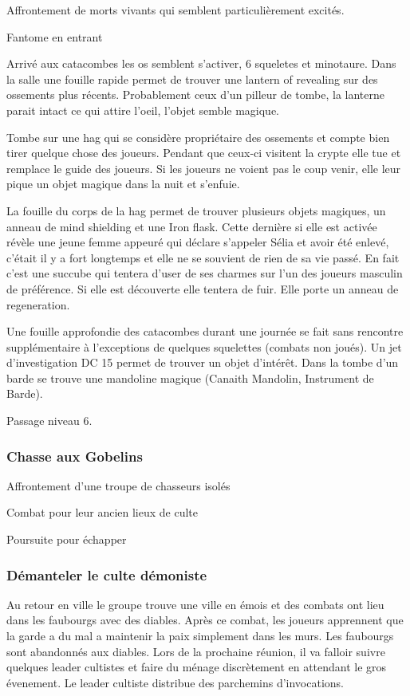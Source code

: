Affrontement de morts vivants qui semblent particulièrement excités.

Fantome en entrant

Arrivé aux catacombes les os semblent s'activer, 6 squeletes et minotaure.
Dans la salle une fouille rapide permet de trouver une lantern of revealing 
sur des ossements plus récents. Probablement ceux d'un pilleur de tombe, la 
lanterne parait intact ce qui attire l'oeil, l'objet semble magique.

Tombe sur une hag qui se considère propriétaire des ossements et compte bien tirer quelque chose des joueurs.
Pendant que ceux-ci visitent la crypte elle tue et remplace le guide des joueurs. Si les joueurs ne voient pas le coup
venir, elle leur pique un objet magique dans la nuit et s'enfuie.

La fouille du corps de la hag permet de trouver plusieurs objets magiques, un anneau de mind shielding
et une Iron flask. Cette dernière si elle est activée révèle une jeune femme appeuré qui déclare
s'appeler Sélia et avoir été enlevé, c'était il y a fort longtemps et elle ne se souvient de rien
de sa vie passé. En fait c'est une succube qui tentera d'user de ses charmes sur l'un des joueurs
masculin de préférence. Si elle est découverte elle tentera de fuir. Elle porte un anneau de regeneration.

Une fouille approfondie des catacombes durant une journée se fait sans rencontre supplémentaire
à l'exceptions de quelques squelettes (combats non joués). Un jet d'investigation DC 15 permet
de trouver un objet d'intérêt. Dans la tombe d'un barde se trouve une mandoline magique
(Canaith Mandolin, Instrument de Barde).

Passage niveau 6.

\subsubsection*{Chasse aux Gobelins}

Affrontement d'une troupe de chasseurs isolés

Combat pour leur ancien lieux de culte 

Poursuite pour échapper

\subsubsection*{Démanteler le culte démoniste}

Au retour en ville le groupe trouve une ville en émois et des combats ont 
lieu dans les faubourgs avec des diables. Après ce combat, les joueurs apprennent
que la garde a du mal a maintenir la paix simplement dans les murs. Les faubourgs 
sont abandonnés aux diables. Lors de la prochaine réunion, il va falloir suivre
quelques leader cultistes et faire du ménage discrètement en attendant le gros 
évenement. Le leader cultiste distribue des parchemins d'invocations.

